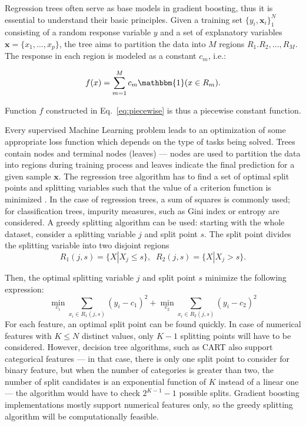 \documentclass[magisterska, english]{pwr_wmat_praca_dyplomowa}
\theoremstyle{plain}
\numberwithin{theorem}{chapter}
\theoremstyle{definition}
\numberwithin{theorem}{chapter}
\begin{document}
Regression trees often serve as base models in gradient boosting, thus it is essential to understand their basic principles. Given a training set $\{y_i,\mathbf{x}_i\}_1^N$ consisting of a random response variable $y$ and a set of explanatory variables $\mathbf{x} = \{x_1,\ldots,x_p\}$, the tree aims to partition the data into $M$ regions $R_1. R_2,\ldots, R_M$. The response in each region is modeled as a constant $c_m$, i.e.:

\begin{equation}\label{eq:piecewise}
    f(x) = \sum_{m=1}^M c_m \mathbbm{1}(x\in R_m).
\end{equation}

\noindent Function $f$ constructed in Eq.~\eqref{eq:piecewise} is thus a piecewise constant function.

Every supervised Machine Learning problem leads to an optimization of some appropriate loss function which depends on the type of tasks being solved. Trees contain nodes and terminal nodes (leaves) --- nodes are used to partition the data into regions during training process and leaves indicate the final prediction for a given sample $\mathbf{x}$.
The regression tree algorithm has to find a set of optimal split points and splitting variables such that the value of a criterion function is minimized \cite{esl}. In the case of regression trees, a sum of squares is commonly used; for classification trees, impurity measures, such as Gini index or entropy are considered. A greedy splitting algorithm can be used: starting with the whole dataset, consider a splitting variable $j$ and split point $s$. The split point divides the splitting variable into two disjoint regions \cite{esl}
\begin{equation}
    R_1(j,s) = \{X|X_j\le s\}, \;\; R_2(j,s) = \{X|X_j> s\}.
\end{equation}

Then, the optimal splitting variable $j$ and split point $s$ minimize the following expression:
\begin{equation}
    \min_{c_1} \sum_{x_i\in R_1(j,s)} (y_i - c_1)^2 + \min_{c_2} \sum_{x_i\in R_2(j,s)} (y_i - c_2)^2
\end{equation}
For each feature, an optimal split point can be found quickly. In case of numerical features with $K\le N$ distinct values, only $K-1$ splitting points will have to be considered. However, decision tree algorithms, such as CART also support categorical features --- in that case, there is only one split point to consider for binary feature, but when the number of categories is greater than two, the number of split candidates is an exponential function of $K$ instead of a linear one --- the algorithm would have to check $2^{K-1} - 1$ possible splits. Gradient boosting implementations mostly support numerical features only, so the greedy splitting algorithm will be computationally feasible.
\end{document}
